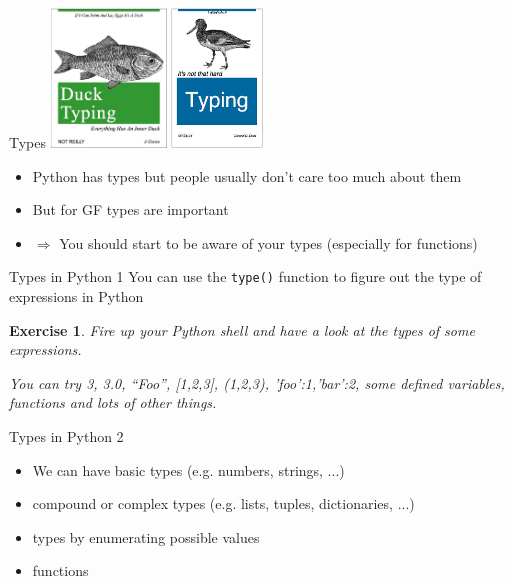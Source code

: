 \documentclass{beamer}
\newtheorem{exercise}{Exercise}
\begin{document}
\begin{frame}{Types}
  \includegraphics[height=10em]{types1}
  \includegraphics[height=10em]{types2}
  \begin{itemize}
  \item Python has types but people usually don't care too much about them
  \item But for GF types are important
  \item $\Rightarrow$ You should start to be aware of your types (especially for functions)
  \end{itemize}
\end{frame}
\begin{frame}{Types in Python 1}
 You can use the \texttt{type()} function to figure out the type of expressions in Python
 \begin{exercise}
   Fire up your Python shell and have a look at the types of some expressions.

   You can try 3, 3.0, ``Foo'', [1,2,3], (1,2,3), {'foo':1,'bar':2}, some defined variables, functions and lots of other things.
 \end{exercise}
\end{frame}
\begin{frame}{Types in Python 2}
  \begin{itemize}
  \item We can have basic types (e.g. numbers, strings, ...)
  \item compound or complex types (e.g. lists, tuples, dictionaries, ...)
  \item types by enumerating possible values
  \item functions
  \end{itemize}
  
\end{frame}
\end{document}
